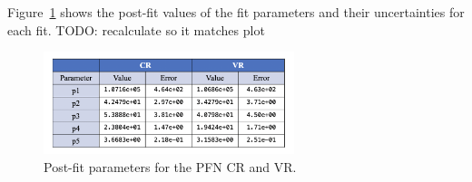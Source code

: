 Figure~\ref{fig:postfit_param_pfn} shows the post-fit values of the fit parameters and their uncertainties for each fit. 
TODO: recalculate so it matches plot
\begin{figure}[!htbp]
\centering
   \includegraphics[width=0.65\textwidth]{figures/stats/postfit_param_pfn}
    \caption{Post-fit parameters for the PFN CR and VR.
    \label{fig:postfit_param_pfn}}
\end{figure}


